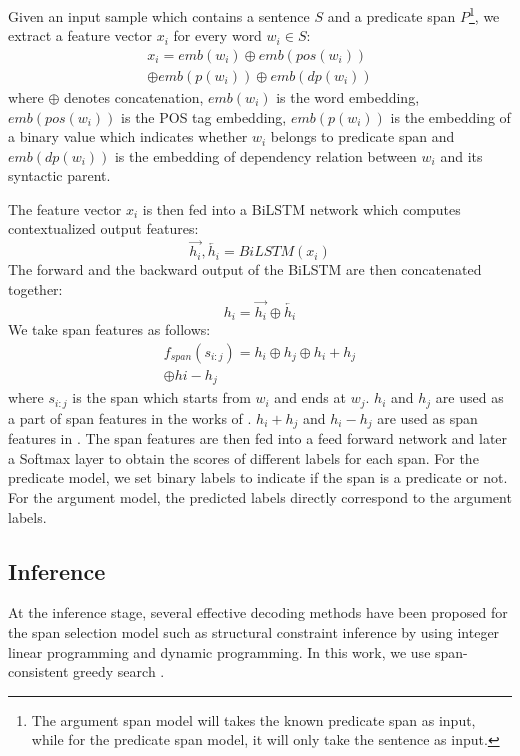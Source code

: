 \documentclass[letterpaper]{article} \usepackage{aaai20}  \usepackage{times}  \usepackage{helvet} \usepackage{courier}  \usepackage[hyphens]{url}  \urlstyle{rm} \def\UrlFont{\rm}  \usepackage{graphicx}  \frenchspacing  \setlength{\pdfpagewidth}{8.5in}  \setlength{\pdfpageheight}{11in}
\begin{document}
Given an input sample which contains a sentence $S$ and a predicate span $P$\footnote{The argument span model will takes the known predicate span as input, while for the predicate span model, it will only take the sentence as input.}, we extract a feature vector $x_i$ for every word $w_i \in S $:
\begin{equation}
    \begin{split}
        x_i=emb(w_i) \oplus emb(pos(w_i))
        \\ \oplus  emb(p(w_i)) \oplus emb(dp(w_i))
    \end{split}
\end{equation}
where $\oplus$ denotes concatenation, $emb(w_i)$ is the word embedding, $emb(pos(w_i))$ is the POS tag embedding, $emb(p(w_i))$ is the embedding of a binary value which indicates whether $w_i$ belongs to predicate span and $emb(dp(w_i))$ is the embedding of dependency relation between $w_i$ and its syntactic parent.

The feature vector $x_i$ is then fed into a BiLSTM network which computes contextualized output features:
\begin{equation}
    \overrightarrow{h_i},\overleftarrow{h_i} = BiLSTM(x_i)
\end{equation}
The forward and the backward output of the BiLSTM are then concatenated together:
\begin{equation}
    h_i = \overrightarrow{h_i}\oplus\overleftarrow{h_i}
\end{equation}
We take span features as follows:
\begin{equation}\label{span_feature}
    \begin{split}
        f_{span}(s_{i:j}) = h_i \oplus h_j \oplus h_i + h_j\\
         \oplus hi - h_j 
    \end{split}
\end{equation}
where $s_{i:j}$ is the span which starts from $w_i$ and ends at $w_j$. $h_i$ and $h_j$ are used as a part of span features in the works of \cite{He2018JointlyPP}. $h_i+h_j$ and $h_i-h_j$ are used as span features in \cite{Ouchi2018ASS}. The span features are then fed into a feed forward network and later a Softmax layer to obtain the scores of different labels for each span. For the predicate model, we set binary labels to indicate if the span is a predicate or not. For the argument model, the predicted labels directly correspond to the argument labels. 

\subsection{Inference}
 At the inference stage, several effective decoding methods have been proposed for the span selection model such as structural constraint inference by using integer linear programming  and dynamic programming. In this work, we use  span-consistent greedy search \cite{Ouchi2018ASS}. 
\end{document}
